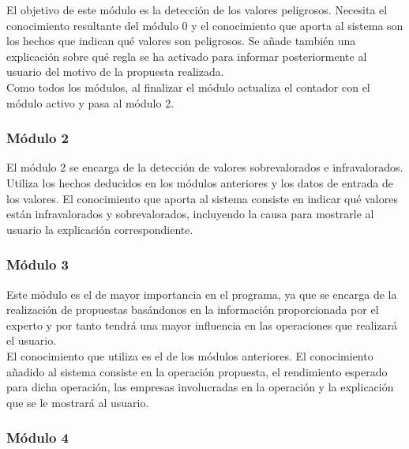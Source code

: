 \documentclass[11pt,leqno]{article}
\theoremstyle{definition_wo_parentheses}
\theoremstyle{plain}
\theoremstyle{remark}
\begin{document}
	El objetivo de este módulo es la detección de los valores peligrosos. Necesita el conocimiento resultante del módulo 0 y el conocimiento que aporta al sistema son los hechos que indican qué valores son peligrosos. Se añade también una explicación sobre qué regla se ha activado para informar posteriormente al usuario del motivo de la propuesta realizada.\\
	
	Como todos los módulos, al finalizar el módulo actualiza el contador con el módulo activo y pasa al módulo 2.
	
	
\subsubsection{Módulo 2}

	El módulo 2 se encarga de la detección de valores sobrevalorados e infravalorados. Utiliza los hechos deducidos en los módulos anteriores y los datos de entrada de los valores. El conocimiento que aporta al sistema consiste en indicar qué valores están infravalorados y sobrevalorados, incluyendo la causa para mostrarle al usuario la explicación correspondiente.
	
\subsubsection{Módulo 3}

	Este módulo es el de mayor importancia en el programa, ya que se encarga de la realización de propuestas basándonos en la información proporcionada por el experto y por tanto tendrá una mayor influencia en las operaciones que realizará el usuario. \\
	El conocimiento que utiliza es el de los módulos anteriores. El conocimiento añadido al sistema consiste en la operación propuesta, el rendimiento esperado para dicha operación, las empresas involucradas en la operación y la explicación que se le mostrará al usuario. 
	
\subsubsection{Módulo 4}
\end{document}
